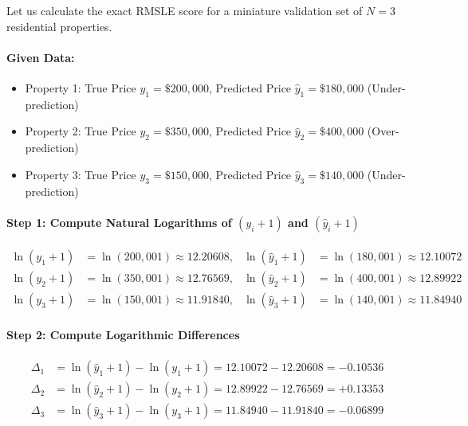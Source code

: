 \begin{example}
Let us calculate the exact RMSLE score for a miniature validation set of $N = 3$ residential properties.

\paragraph{Given Data:}
\begin{itemize}
    \item Property 1: True Price $y_1 = \$200{,}000$, Predicted Price $\hat{y}_1 = \$180{,}000$ (Under-prediction)
    \item Property 2: True Price $y_2 = \$350{,}000$, Predicted Price $\hat{y}_2 = \$400{,}000$ (Over-prediction)
    \item Property 3: True Price $y_3 = \$150{,}000$, Predicted Price $\hat{y}_3 = \$140{,}000$ (Under-prediction)
\end{itemize}

\paragraph{Step 1: Compute Natural Logarithms of $(y_i + 1)$ and $(\hat{y}_i + 1)$}
\begin{align*}
\ln(y_1 + 1) &= \ln(200{,}001) \approx \mathbf{12.20608}, & \ln(\hat{y}_1 + 1) &= \ln(180{,}001) \approx \mathbf{12.10072} \\
\ln(y_2 + 1) &= \ln(350{,}001) \approx \mathbf{12.76569}, & \ln(\hat{y}_2 + 1) &= \ln(400{,}001) \approx \mathbf{12.89922} \\
\ln(y_3 + 1) &= \ln(150{,}001) \approx \mathbf{11.91840}, & \ln(\hat{y}_3 + 1) &= \ln(140{,}001) \approx \mathbf{11.84940}
\end{align*}

\paragraph{Step 2: Compute Logarithmic Differences}
\begin{align*}
\Delta_1 &= \ln(\hat{y}_1 + 1) - \ln(y_1 + 1) = 12.10072 - 12.20608 = \mathbf{-0.10536} \\
\Delta_2 &= \ln(\hat{y}_2 + 1) - \ln(y_2 + 1) = 12.89922 - 12.76569 = \mathbf{+0.13353} \\
\Delta_3 &= \ln(\hat{y}_3 + 1) - \ln(y_3 + 1) = 11.84940 - 11.91840 = \mathbf{-0.06899}
\end{align*}


\end{example}
